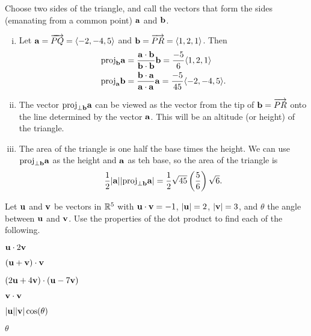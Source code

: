 \begin{exercises}
\begin{exerciseSolution}
	\item Choose two sides of the triangle, and call the vectors that form the sides (emanating from a common point) $\mathbf{a}$ and $\mathbf{b}$.
		\begin{enumerate}[i.]
		\item Let $\mathbf{a} = \overrightarrow{PQ} = \langle -2, -4, 5 \rangle$ and $\mathbf{b} = \overrightarrow{PR} = \langle 1,2,1 \rangle$. Then
\begin{align*}
\text{proj}_{\mathbf{b}} \mathbf{a} &= \frac{\mathbf{a} \cdot \mathbf{b}}{\mathbf{b} \cdot \mathbf{b}} \mathbf{b} = \frac{-5}{6} \langle 1,2,1 \rangle \\
\text{proj}_{\mathbf{a}} \mathbf{b} &= \frac{\mathbf{b} \cdot \mathbf{a}}{\mathbf{a} \cdot \mathbf{a}} \mathbf{a} = \frac{-5}{45} \langle -2,-4,5 \rangle.
\end{align*}

		\item The vector $\text{proj}_{\perp \mathbf{b}} \mathbf{a}$ can be viewed as the vector from the tip of $\mathbf{b} = \overrightarrow{PR}$ onto the line determined by the vector $\mathbf{a}$. This will be an altitude (or height) of the triangle. 
		\item The area of the triangle is one half the base times the height. We can use $\text{proj}_{\perp \mathbf{b}} \mathbf{a}$ as the height and $\mathbf{a}$ as teh base, so the area of the triangle is
\[\frac{1}{2} |\mathbf{a}| |\text{proj}_{\perp \mathbf{b}} \mathbf{a}| = \frac{1}{2} \sqrt{45} \left(\frac{5}{6}\right) \sqrt{6}.\]

	\end{enumerate}
    \ea
    
\end{exerciseSolution}

\item \label{Ez:9.3.3}    Let $\mathbf{u}$ and $\mathbf{v}$ be vectors in $\mathbb{R}^5$ with $\mathbf{u} \cdot \mathbf{v} = -1$, $| \mathbf{u} | = 2$, $| \mathbf{v} | = 3$, and $\theta$ the angle between $\mathbf{u}$ and $\mathbf{v}$. Use the properties of the dot product to find each of the following.
    \ba
    \item $\mathbf{u} \cdot 2\mathbf{v}$

    \item $(\mathbf{u} + \mathbf{v}) \cdot \mathbf{v}$

    \item $(2\mathbf{u}+4\mathbf{v}) \cdot (\mathbf{u} - 7\mathbf{v})$
    
    \item $\mathbf{v} \cdot \mathbf{v}$
    
    \item $|\mathbf{u}| |\mathbf{v}| \cos(\theta)$
    
    \item $\theta$

    \ea


\end{exercises}
